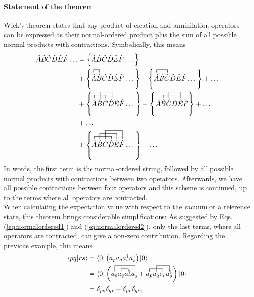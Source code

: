 \paragraph{Statement of the theorem}
Wick's theorem \cite{1950PhRv...80..268W} states that any product of creation and annihilation operators can be expressed as their normal-ordered product plus the sum of all possible normal products with contractions. Symbolically, this means
\begin{align}
\hat{A}\hat{B}\hat{C}\hat{D}\hat{E}\hat{F}\dots &= \left\lbrace \hat{A}\hat{B}\hat{C}\hat{D}\hat{E}\hat{F}\dots \right\rbrace \notag\\
&+ \left\lbrace \contraction{}{\hat{A}}{}{\hat{B}}\hat{A}\hat{B}\hat{C}\hat{D}\hat{E}\hat{F}\dots \right\rbrace + \left\lbrace\contraction{}{\hat{A}}{\hat{B}}{\hat{C}}
\hat{A}\hat{B}\hat{C}\hat{D}\hat{E}\hat{F}\dots \right\rbrace + \dots \notag \\
&+ \left\lbrace
\contraction{}{\hat{A}}{\hat{B}}{\hat{C}}
\contraction[2ex]{\hat{B}}{\hat{C}}{\hat{D}}{\hat{E}}
{ \hat{A}\hat{B}\hat{C}\hat{D}\hat{E}\hat{F}}\dots \right\rbrace 
+ \left\lbrace 
\contraction{\hat{A}}{\hat{B}}{\hat{C}}{\hat{D}}
\contraction[2ex]{\hat{A}\hat{B}}{\hat{C}}{\hat{D}}{\hat{E}}
{\hat{A}\hat{B}\hat{C}\hat{D}\hat{E}\hat{F}} \right\rbrace + \dots \notag  \\
&+ \dots \\
&+\left\lbrace 
\contraction{}{\hat{A}}{\hat{B}\hat{C}}{\hat{D}}
\contraction[2ex]{\hat{A}}{\hat{B}}{{\hat{C}\hat{D}}}{\hat{E}}
\contraction[3ex]{\hat{A}\hat{B}}{\hat{C}}{{\hat{D}\hat{E}}}{\hat{F}}
{\hat{A}\hat{B}\hat{C}\hat{D}\hat{E}\hat{F}}\dots \right\rbrace + \dots 
\end{align}
In words, the first term is the normal-ordered string, followed by all possible normal products with contractions between two operators. Afterwards, we have all possible contractions between four operators and this scheme is continued, up to the terms where all operators are contracted.\\
When calculating the expectation value with respect to the vacuum or a reference state, this theorem brings considerable simplifications: As suggested by Eqs. (\ref{eq:normalordered1}) and (\ref{eq:normalordered2}), only the last terms, where all operators are contracted, can give a non-zero contribution. Regarding the previous example, this means
\begin{align*}
\langle pq|rs\rangle &= \langle 0|\lb a_p a_q \ad_r \ad_s \rb|0\rangle \\
&= \langle 0|\lb \contraction{a_p}{a_q}{}{\ad_r}
\contraction[2ex]{}{a_p}{a_q\ad_r}{\ad_s}
a_p a_q \ad_r \ad_s + 
\contraction{}{a_p}{a_q}{\ad_r}
\contraction[2ex]{a_p}{a_q}{\ad_r}{\ad_s}
a_p a_q \ad_r \ad_s
\rb |0\rangle \\
&= \delta_{ps}\delta_{qr} - \delta_{pr}\delta_{qs},
\end{align*}
